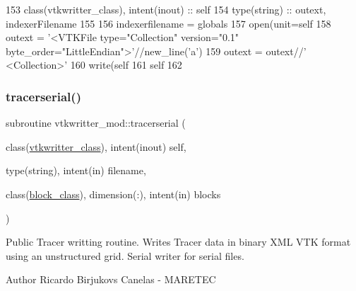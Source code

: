 \begin{DoxyCode}
153     \textcolor{keywordtype}{class}(vtkwritter\_class), \textcolor{keywordtype}{intent(inout)} :: self
154     \textcolor{keywordtype}{type}(string) :: outext, indexerFilename
155     
156     indexerfilename = globals%
157     \textcolor{keyword}{open}(unit=self%
158     outext = \textcolor{stringliteral}{'<VTKFile type="Collection" version="0.1" byte\_order="LittleEndian">'}//new\_line(\textcolor{stringliteral}{'a'})
159     outext = outext//\textcolor{stringliteral}{'  <Collection>'}    
160     \textcolor{keyword}{write}(self%
161     self%
162     
\end{DoxyCode}
\mbox{\label{namespacevtkwritter__mod_ac11e4d1d71141e6de89ba67508212ce0}} 
\subsubsection{\texorpdfstring{tracerserial()}{tracerserial()}}
{\footnotesize\ttfamily subroutine vtkwritter\+\_\+mod\+::tracerserial (\begin{DoxyParamCaption}\item[{class(\mbox{\hyperlink{structvtkwritter__mod_1_1vtkwritter__class}{vtkwritter\+\_\+class}}), intent(inout)}]{self,  }\item[{type(string), intent(in)}]{filename,  }\item[{class(\mbox{\hyperlink{structblocks__mod_1_1block__class}{block\+\_\+class}}), dimension(\+:), intent(in)}]{blocks }\end{DoxyParamCaption})\hspace{0.3cm}{\ttfamily [private]}}



Public Tracer writting routine. Writes Tracer data in binary X\+ML V\+TK format using an unstructured grid. Serial writer for serial files. 

\begin{DoxyAuthor}{Author}
Ricardo Birjukovs Canelas -\/ M\+A\+R\+E\+T\+EC 
\end{DoxyAuthor}

